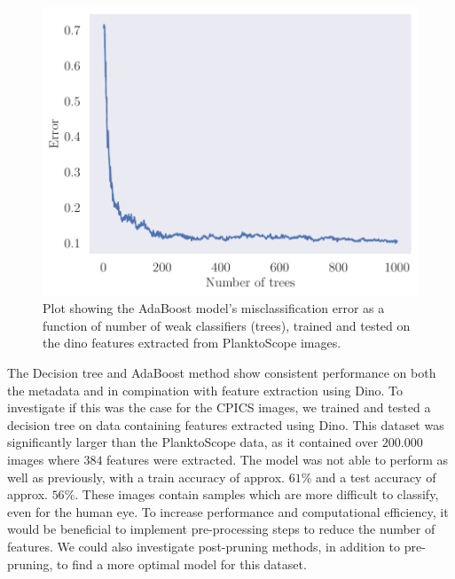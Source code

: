 \begin{figure}
    \centering
    \includegraphics[width=\linewidth]{latex/figures/be_adaboost_planktoscope_dino.pdf}
    \caption{Plot showing the AdaBoost model's misclassification error as a function of number of weak classifiers (trees), trained and tested on the dino features extracted from PlanktoScope images.}
    \label{fig:be_adaboost_dino}
\end{figure}

The Decision tree and AdaBoost method show consistent performance on both the metadata and in compination with feature extraction using Dino. To investigate if this was the case for the CPICS images, we trained and tested a decision tree on data containing features extracted using Dino. This dataset was significantly larger than the PlanktoScope data, as it contained over $200.000$ images where $384$ features were extracted. The model was not able to perform as well as previously, with a train accuracy of approx. $61\%$ and a test accuracy of approx. $56\%$. These images contain samples which are more difficult to classify, even for the human eye. To increase performance and computational efficiency, it would be beneficial to implement pre-processing steps to reduce the number of features. We could also investigate post-pruning methods, in addition to pre-pruning, to find a more optimal model for this dataset. 


